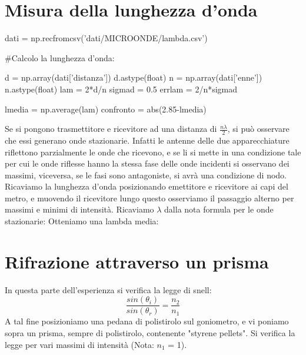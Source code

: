\section{Misura della lunghezza d'onda}

\begin{sagesilent}
dati = np.recfromcsv('dati/MICROONDE/lambda.csv')

#Calcolo la lunghezza d'onda:

d = np.array(dati['distanza'])
d.astype(float)
n = np.array(dati['enne'])
n.astype(float)
lam = 2*d/n
sigmad = 0.5
errlam = 2/n*sigmad

lmedia = np.average(lam)
confronto = abs(2.85-lmedia)


\end{sagesilent}

Se si pongono trasmettitore e ricevitore ad una distanza di $\frac{n \lambda}{2}$, si può osservare che essi generano onde stazionarie. Infatti le antenne delle due apparecchiature riflettono parzialmente le onde che ricevono, e se li si mette in una condizione tale per cui le onde riflesse hanno la stessa fase delle onde incidenti si osservano dei massimi, viceversa, se le fasi sono antagoniste, si avrà una condizione di nodo.
Ricaviamo la lunghezza d'onda posizionando emettitore e ricevitore ai capi del metro, e muovendo il ricevitore lungo questo osserviamo  il passaggio alterno per massimi e minimi di intensità. Ricaviamo $\lambda$ dalla nota formula per le onde stazionarie:
Otteniamo una lambda media: 



\section{Rifrazione attraverso un prisma}

In questa parte dell'esperienza si verifica la legge di snell:
\begin{equation}
\frac{sin(\theta_{i})}{sin(\theta_{r})} = \frac{n_2}{n_1}
\end{equation}
A tal fine posizioniamo una pedana di polistirolo sul goniometro, e vi poniamo sopra un prisma, sempre di polistirolo, contenente "styrene pellets". Si verifica la legge per vari massimi di intensità (Nota: $n_1$ = 1).




